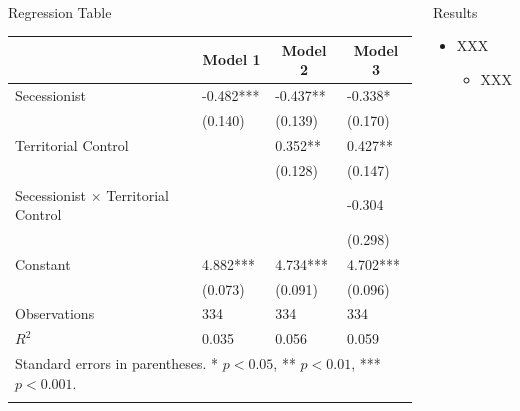 \documentclass[mathserif]{beamer}
\begin{document}
\begin{frame}{~}
\begin{columns}[t]
\begin{block}{Regression Table}
	\begin{table}[h!]\centering
		\begin{tabular}{l l l l}
			\hline\hline\noalign{\smallskip}
			&\multicolumn{1}{c}{Model 1}&\multicolumn{1}{c}{Model 2}&\multicolumn{1}{c}{Model 3}\\
			\hline
			Secessionist        &      -0.482***         &      -0.437**         &          -0.338*           \\
			&     (0.140)         &     (0.139)         &         (0.170)            \\
			[1em]
			Territorial Control &                     &       0.352**         &       0.427**          \\
			&                     &     (0.128)         &        (0.147)            \\
			[1em]
			Secessionist $\times$ Territorial Control&                     &                     &      -0.304         \\
			&                     &                     &     (0.298)         \\
			[1em]
			Constant            &       4.882***&       4.734***  &       4.702***         \\
			&     (0.073)         &     (0.091)         &     (0.096)         \\
			\hline
			Observations        &         334         &         334         &         334         \\
			\(R^{2}\)           &       0.035         &       0.056         &       0.059         \\
			\hline\hline
			\multicolumn{4}{l}{\footnotesize Standard errors in parentheses. {*} \(p<0.05\), {**} \(p<0.01\), {***} \(p<0.001\).} \\
			\noalign{\smallskip}\hline
		\end{tabular}
	\end{table}
\end{block}

\begin{block}{Results}
\begin{itemize}
	\item XXX
	\begin{itemize}
	    \item XXX 
	\end{itemize}	
\end{itemize}	
\end{block}	


\end{columns}
\end{frame}
\end{document}
